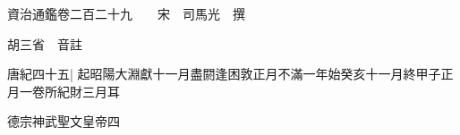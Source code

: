






























































資治通鑑卷二百二十九　　宋　司馬光　撰

胡三省　音註

唐紀四十五|{
	起昭陽大淵獻十一月盡閼逢困敦正月不滿一年始癸亥十一月終甲子正月一卷所紀財三月耳}


德宗神武聖文皇帝四

